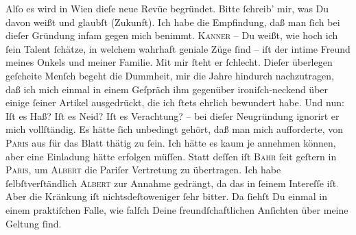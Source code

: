 \pstart
           Alſo es \strikeout{\textcolor{gray}{wa}} wird in Wien dieſe neue Revüe begründet. Bitte ſchreib’ mir, was Du
               davon weißt und glaubſt (Zukunft). Ich habe die Empfindung, daß man ſich bei dieſer
               Gründung infam gegen mich benimmt. \textsc{Kanner} – Du weißt, wie hoch ich ſein Talent ſchätze, in welchem {\pb}wahrhaft geniale Züge ſind – iſt der intime Freund meines Onkels und meiner Familie. Mit
               mir ſteht er ſchlecht. Dieſer überlegen geſcheite Menſch begeht die Dummheit, mir die Jahre hindurch
               nachzutragen, daß ich mich einmal in einem Geſpräch  ihm gegenüber ironiſch-neckend über einige ſeiner Artikel ausgedrückt,
               die ich ſtets ehrlich bewundert habe. Und nun: Iſt es Haß? Iſt es Neid? Iſt es
               Verachtung? – bei dieſer Neugründung ignorirt er mich vollſtändig. Es hätte {\pb}ſich unbedingt gehört, daß man mich aufforderte, von
                  \textsc{Paris} aus für das Blatt thätig
               zu ſein. Ich hätte es kaum je annehmen können, aber eine Einladung hätte erfolgen
               müſſen. Statt deſſen iſt \textsc{Bahr} ſeit geſtern in \textsc{Paris}, um \textsc{Albert} die Pariſer Vertretung zu übertragen. Ich
               habe ſelbſtverſtändlich \textsc{Albert} zur Annahme gedrängt, da das in ſeinem Intereſſe iſt\textcolor{gray}{.} Aber
               die Kränkung iſt nichtsdeſtoweniger ſehr bitter. Da ſiehſt Du einmal in einem
               praktiſchen Falle, wie falſch Deine freundſchaftlichen Anſichten über meine Geltung
               ſind.\pend
           
